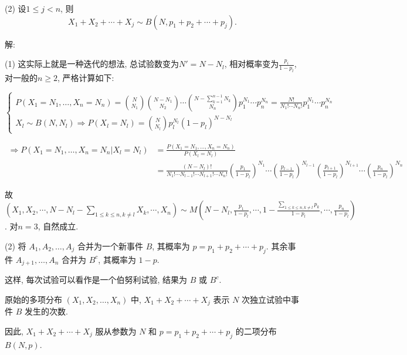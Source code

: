 \documentclass[standard]{ExBook}
\begin{document}
\begin{qitems}
\begin{bbox}
\begin{shaded}
(2) 设$1\leq j<n$, 则
$$X_1+X_2+\cdots+X_j\sim B(N,p_1+p_2+\cdots+p_j).$$
    \end{shaded}
    \end{bbox}

\vspace{-5em}

    \begin{bbox}
解: 

(1) 这实际上就是一种迭代的想法, 总试验数变为$N'=N-N_l$, 相对概率变为$\frac{p_i}{1-p_l}$, 对一般的$n\geq2$, 严格计算如下:
\vspace{-2em}
\begin{center}
\begin{equation}
    \left\{
\begin{array}{l}
    \nonumber
\displaystyle P(X_1 = N_1, \dots, X_n = N_n) = \binom{N}{N_1}\binom{N-N_1}{N_2}\cdots\binom{N-\sum\limits_{k=1}^{n-1}N_{k}}{N_n}p_1^{N_1} \cdots p_n^{N_n} = \frac{N!}{N_1! \cdots N_n!} p_1^{N_1} \cdots p_n^{N_n}\\
X_l\sim B(N,N_l) \Longrightarrow P(X_l=N_l)=\binom{N}{N_l}p_l^{N_l}(1-p_l)^{N-N_l}
\end{array}
    \right.
\end{equation}
\end{center}
\begin{center}
\begin{equation}
\begin{array}{cl}
    \nonumber
\Longrightarrow
P(X_1 = N_1, \dots, X_n = N_n|X_l=N_l)&=\displaystyle \frac{P(X_1 = N_1, \dots, X_n = N_n)}{P(X_l=N_l)}\\
&=\frac{(N-N_l)!}{N_1!\cdots N_{l-1}!\cdots N_{l+1}!\cdots N_n!}\left(\frac{p_1}{1-p_l}\right)^{N_1}\cdots\left(\frac{p_{l-1}}{1-p_l}\right)^{N_{l-1}}\left(\frac{p_{l+1}}{1-p_l}\right)^{N_{l+1}}\cdots\left(\frac{p_n}{1-p_l}\right)^{N_n}
\end{array}
\end{equation}
\end{center}
故$\displaystyle(X_1,X_2,\cdots,N-N_l-\sum\limits_{1\leq k\leq n,k\neq l}X_{k},\cdots,X_n)\sim M(N-N_{l},\frac{p_1}{1-p_l},\cdots,1-\frac{\sum\limits_{1\leq k\leq n,k\neq l}p_{k}}{1-p_l},\cdots,\frac{p_n}{1-p_l})$. 对$n=3$, 自然成立.

(2)
将 \( A_1, A_2, \ldots, A_j \) 合并为一个新事件 \( B \), 其概率为 \( p = p_1 + p_2 + \cdots + p_j \). 其余事件 \( A_{j+1}, \ldots, A_n \) 合并为 \( B^c \), 其概率为 \( 1 - p \).

这样, 每次试验可以看作是一个伯努利试验, 结果为 \( B \) 或 \( B^c \).

原始的多项分布 \( (X_1, X_2, \ldots, X_n) \) 中, \( X_1 + X_2 + \cdots + X_j \) 表示 \( N \) 次独立试验中事件 \( B \) 发生的次数.

因此, \( X_1 + X_2 + \cdots + X_j \) 服从参数为 \( N \) 和 \( p = p_1 + p_2 + \cdots + p_j \) 的二项分布 \( B(N, p) \).
    \end{bbox}
\end{qitems}
\end{document}

